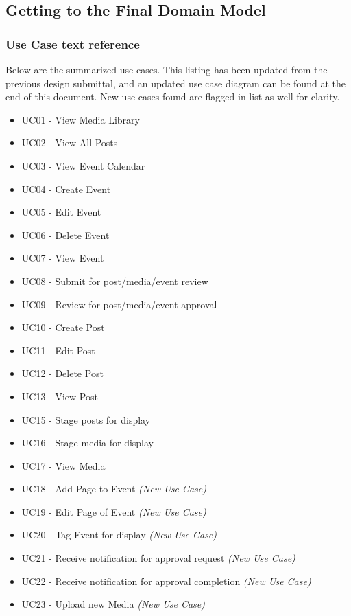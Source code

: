 \documentclass{article}
\begin{document}
\subsection{Getting to the Final Domain Model}
\subsubsection{Use Case text reference}
Below are the summarized use cases.  This listing has been updated from the previous design submittal, and an updated use case diagram can be found at the end of this document.  New use cases found are flagged in list as well for clarity.

\vspace{2ex}
\begin{itemize}
    \item UC01 - View Media Library
    \item UC02 - View All Posts
    \item UC03 - View Event Calendar
    \item UC04 - Create Event
    \item UC05 - Edit Event
    \item UC06 - Delete Event
    \item UC07 - View Event
    \item UC08 - Submit for post/media/event review
    \item UC09 - Review for post/media/event approval
    \item UC10 - Create Post
    \item UC11 - Edit Post
    \item UC12 - Delete Post
    \item UC13 - View Post
    \item UC15 - Stage posts for display
    \item UC16 - Stage media for display
    \item UC17 - View Media
    \item UC18 - Add Page to Event \textit{(New Use Case)}
    \item UC19 - Edit Page of Event \textit{(New Use Case)}
    \item UC20 - Tag Event for display \textit{(New Use Case)}
    \item UC21 - Receive notification for approval request \textit{(New Use Case)}
    \item UC22 - Receive notification for approval completion \textit{(New Use Case)}
    \item UC23 - Upload new Media \textit{(New Use Case)}
\end{itemize}
\end{document}
